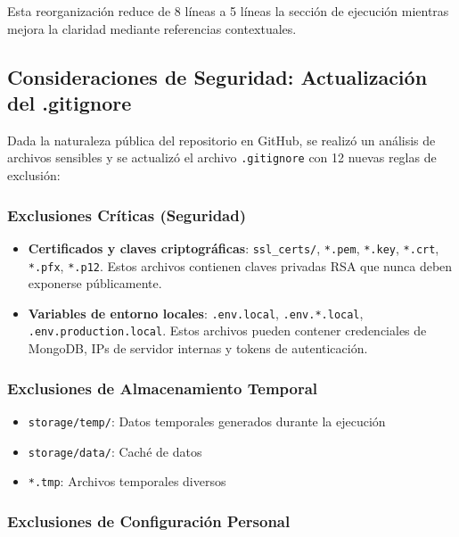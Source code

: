 \documentclass[12pt,a4paper]{article}
\begin{document}
Esta reorganización reduce de 8 líneas a 5 líneas la sección de ejecución mientras mejora la claridad mediante referencias contextuales.

\subsection{Consideraciones de Seguridad: Actualización del .gitignore}

Dada la naturaleza pública del repositorio en GitHub, se realizó un análisis de archivos sensibles y se actualizó el archivo \texttt{.gitignore} con 12 nuevas reglas de exclusión:

\subsubsection{Exclusiones Críticas (Seguridad)}

\begin{itemize}
    \item \textbf{Certificados y claves criptográficas}: \texttt{ssl\_certs/}, \texttt{*.pem}, \texttt{*.key}, \texttt{*.crt}, \texttt{*.pfx}, \texttt{*.p12}. Estos archivos contienen claves privadas RSA que nunca deben exponerse públicamente.
    
    \item \textbf{Variables de entorno locales}: \texttt{.env.local}, \texttt{.env.*.local}, \texttt{.env.production.local}. Estos archivos pueden contener credenciales de MongoDB, IPs de servidor internas y tokens de autenticación.
\end{itemize}

\subsubsection{Exclusiones de Almacenamiento Temporal}

\begin{itemize}
    \item \texttt{storage/temp/}: Datos temporales generados durante la ejecución
    \item \texttt{storage/data/}: Caché de datos
    \item \texttt{*.tmp}: Archivos temporales diversos
\end{itemize}

\subsubsection{Exclusiones de Configuración Personal}
\end{document}
